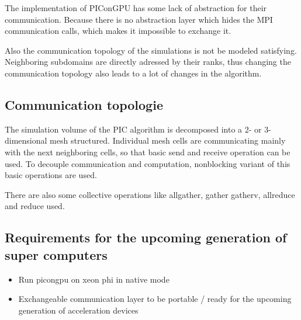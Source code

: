 The implementation of PIConGPU has some lack of abstraction for their
communication. Because there is no abstraction layer which hides
the MPI communication calls, which makes it impossible to exchange it.

Also the communication topology of the simulations is not be modeled
satisfying. Neighboring subdomains are directly adressed by their
ranks, thus changing the communication topology also leads
to a lot of changes in the algorithm.

\subsection{Communication topologie}
The simulation volume of the PIC algorithm is decomposed
into a 2- or 3- dimensional mesh structured. Individual
mesh cells are communicating mainly with the next 
neighboring cells, so that basic send and receive operation
can be used. To decouple communication and computation,
nonblocking variant of this basic operations are used.

There are also some collective operations like allgather, gather
gatherv, allreduce and reduce used.

\subsection{Requirements for the upcoming generation of super computers}
\begin{itemize}
\item Run picongpu on xeon phi in native mode
\item Exchangeable communication layer to be portable / ready  for the upcoming
  generation of acceleration devices
\end{itemize}



\cleardoublepage

